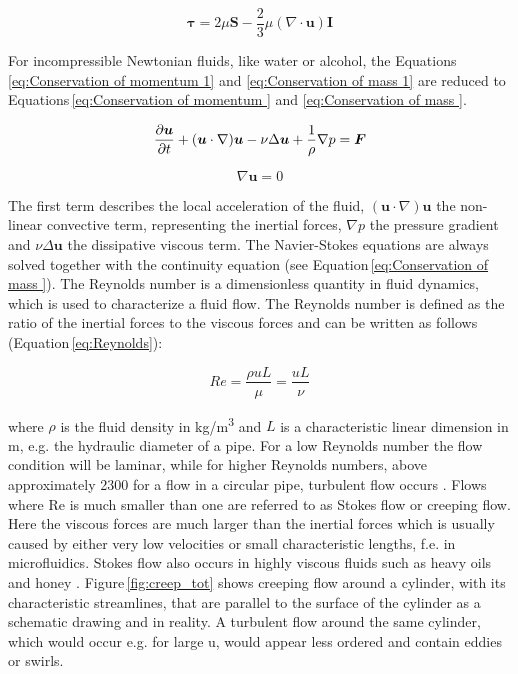 \begin{equation}
\boldsymbol\tau = 2\mu\boldsymbol S - \frac{2}{3}\mu(\nabla\cdotp\boldsymbol u)\boldsymbol I
\label{eq:stress_tensor}
\end{equation}

For incompressible Newtonian fluids, like water or alcohol, the Equations\,\ref{eq:Conservation of momentum 1} and \ref{eq:Conservation of mass 1} are reduced to Equations\,\ref{eq:Conservation of momentum } and \ref{eq:Conservation of mass }\cite{versteeg2007introduction}. 

\begin{equation}
{\partial{\boldsymbol u}\over{\partial t}} + ({\boldsymbol u} \cdot \nabla) {\boldsymbol u} - \nu\Delta{\boldsymbol u}+ \frac{1}{\rho}\nabla p = {\boldsymbol F}
\label{eq:Conservation of momentum }
\end{equation}

\begin{equation}
\nabla{\boldsymbol u} = 0
\label{eq:Conservation of mass }
\end{equation}
 
The first term describes the local acceleration of the fluid, $({\boldsymbol u} \cdot \nabla) {\boldsymbol u}$ the non-linear convective term, representing the inertial forces, $\nabla p$ the pressure gradient and $\nu\Delta{\boldsymbol u}$ the dissipative viscous term. The Navier-Stokes equations are always solved together with the continuity equation (see Equation\,\ref{eq:Conservation of mass }). 
The Reynolds number is a dimensionless quantity in fluid dynamics, which is used to characterize a fluid flow. The Reynolds number is defined as the ratio of the inertial forces to the viscous forces and can be written as follows (Equation\,\ref{eq:Reynolds}):  

\begin{equation}
Re=\frac{\rho u L}{\mu}=\frac{uL}{\nu}
\label{eq:Reynolds}
\end{equation}

where $\rho$ is the fluid density in kg/m\textsuperscript{3} and $L$ is a characteristic linear dimension in m, e.g. the hydraulic diameter of a pipe. For a low Reynolds number the flow condition will be laminar, while for higher Reynolds numbers, above approximately 2300 for a flow in a circular pipe, turbulent flow occurs \cite{schwarze2012cfd}. Flows where Re is much smaller than one are referred to as Stokes flow or creeping flow. Here the viscous forces are much larger than the inertial forces which is usually caused by either very low velocities or small characteristic lengths, f.e. in microfluidics. Stokes flow also occurs in highly viscous fluids such as heavy oils and honey \cite{lautrup2004physics}. Figure\,\ref{fig:creep_tot} shows creeping flow around a cylinder, with its characteristic streamlines, that are parallel to the surface of the cylinder as a schematic drawing and in reality. A turbulent flow around the same cylinder, which would occur e.g. for large u, would appear less ordered and contain eddies or swirls.

